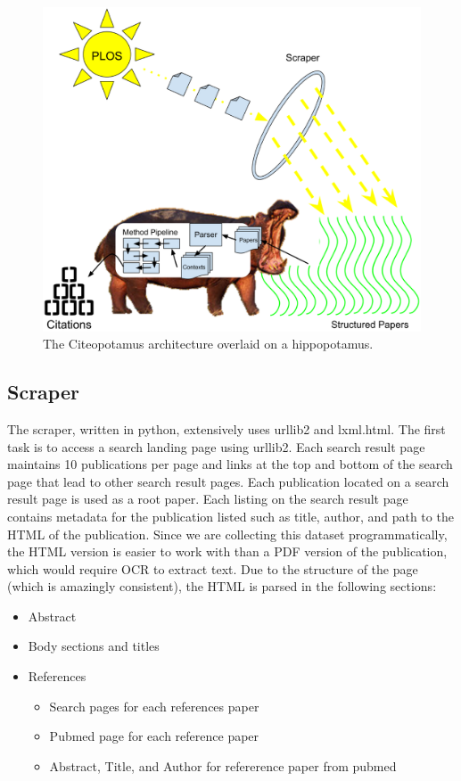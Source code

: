 \documentclass[10pt, conference, compsocconf]{IEEEtran}
\begin{document}
\begin{figure}[ht]
   \includegraphics[width=\textwidth]{images/arch.eps}
        \caption{The Citeopotamus architecture overlaid on a hippopotamus.}
        \label{fig:arch}
\end{figure}

\subsection{Scraper}\label{sec:scrape}
The scraper, written in python, extensively uses urllib2 and lxml.html. The
first task is to access a search landing page using urllib2. Each search result
page maintains 10 publications per page and links at the top
and bottom of the search page that lead to other search result pages. Each
publication located on a search result page is used as a root paper.
Each listing on the search result page contains metadata for the publication
listed such as title, author, and path to the HTML of the publication.
Since we are collecting this dataset programmatically, the HTML
version is easier to work with than a PDF version of the publication, which
would require OCR to extract text. Due to the structure of the page (which is
amazingly consistent), the HTML is parsed in the following sections:
\begin{itemize}
   \item Abstract
   \item Body sections and titles
   \item References
      \begin{itemize}
         \item Search pages for each references paper
         \item Pubmed page for each reference paper
         \item Abstract, Title, and Author for refererence paper from pubmed
      \end{itemize}
\end{itemize}
\end{document}
